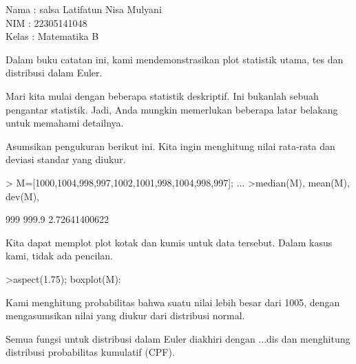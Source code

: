 \documentclass[a4paper,10pt]{article}
\begin{document}
\begin{eulernotebook}
\begin{eulercomment}
Nama : salsa Latifatun Nisa Mulyani\\
NIM : 22305141048\\
Kelas : Matematika B\\
\end{eulercomment}
\eulersubheading{}
\begin{eulercomment}
Dalam buku catatan ini, kami mendemonstrasikan plot statistik utama,
tes dan distribusi dalam Euler.

Mari kita mulai dengan beberapa statistik deskriptif. Ini bukanlah
sebuah pengantar statistik. Jadi, Anda mungkin memerlukan beberapa
latar belakang untuk memahami detailnya.

Asumsikan pengukuran berikut ini. Kita ingin menghitung nilai
rata-rata dan deviasi standar yang diukur.
\end{eulercomment}
\begin{eulerprompt}
> M=[1000,1004,998,997,1002,1001,998,1004,998,997]; ...
>median(M), mean(M), dev(M),
\end{eulerprompt}
\begin{euleroutput}
  999
  999.9
  2.72641400622
\end{euleroutput}
\begin{eulercomment}
Kita dapat memplot plot kotak dan kumis untuk data tersebut. Dalam
kasus kami, tidak ada pencilan.
\end{eulercomment}
\begin{eulerprompt}
>aspect(1.75); boxplot(M):
\end{eulerprompt}
\begin{eulercomment}
Kami menghitung probabilitas bahwa suatu nilai lebih besar dari 1005,
dengan mengasumsikan nilai yang diukur dari distribusi normal.

Semua fungsi untuk distribusi dalam Euler diakhiri dengan ...dis dan
menghitung distribusi probabilitas kumulatif (CPF).


\end{eulercomment}
\end{eulernotebook}
\end{document}
